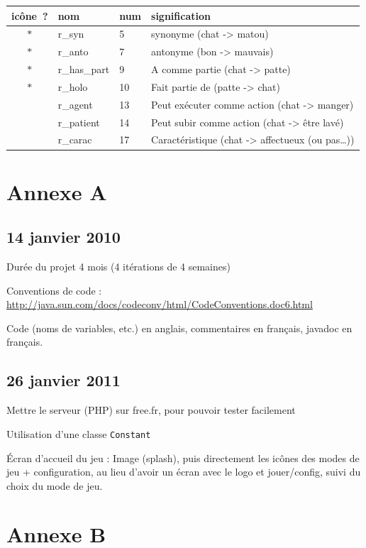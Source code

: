 \documentclass[a4paper,11pt,french]{article}
\begin{document}
\begin{tabular}{|c|l|l|l|}
\hline
icône~? & nom & num & signification \\
\hline
$*$ & r\_syn       & 5  & synonyme (chat -> matou) \\
$*$ & r\_anto      & 7  & antonyme (bon -> mauvais) \\
$*$ & r\_has\_part & 9  & A comme partie (chat -> patte) \\
$*$ & r\_holo      & 10 & Fait partie de (patte -> chat) \\
    & r\_agent     & 13 & Peut exécuter comme action (chat -> manger) \\
    & r\_patient   & 14 & Peut subir comme action (chat -> être lavé) \\
    & r\_carac     & 17 & Caractéristique (chat -> affectueux (ou pas…)) \\
\hline
\end{tabular}
\newpage

\appendix

\section{Annexe A}


\subsection{14 janvier 2010}


Durée du projet 4 mois (4 itérations de 4 semaines)

Conventions de code : \url{http://java.sun.com/docs/codeconv/html/CodeConventions.doc6.html}

Code (noms de variables, etc.) en anglais, commentaires en français, javadoc en français.

\subsection{26 janvier 2011}
Mettre le serveur (PHP) sur free.fr, pour pouvoir tester facilement

Utilisation d'une classe \verb!Constant!

Écran d'accueil du jeu : Image (splash), puis directement les icônes des modes de jeu + configuration, au lieu d'avoir un écran avec le logo et jouer/config, suivi du choix du mode de jeu.

\section{Annexe B}
\end{document}
